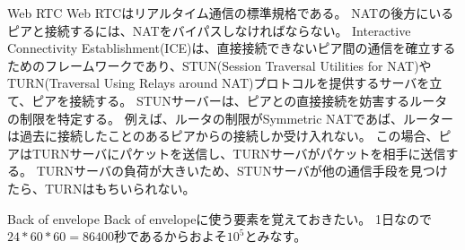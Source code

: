 \documentclass{jlreq}
\begin{document}
\begin{section-bib}{Web RTC}
  Web RTCはリアルタイム通信の標準規格である\cite{webrtc}。
  NATの後方にいるピアと接続するには、NATをバイパスしなければならない。
  Interactive Connectivity Establishment(ICE)は、直接接続できないピア間の通信を確立するためのフレームワークであり、STUN(Session Traversal Utilities for NAT)やTURN(Traversal Using Relays around NAT)プロトコルを提供するサーバを立て、ピアを接続する\cite{mdn-webrtc}。
  STUNサーバーは、ピアとの直接接続を妨害するルータの制限を特定する。
  例えば、ルータの制限がSymmetric NATであば、ルーターは過去に接続したことのあるピアからの接続しか受け入れない。
  この場合、ピアはTURNサーバにパケットを送信し、TURNサーバがパケットを相手に送信する。
  TURNサーバの負荷が大きいため、STUNサーバが他の通信手段を見つけたら、TURNはもちいられない。
\end{section-bib}
\begin{section-bib}{Back of envelope}
  Back of envelopeに使う要素を覚えておきたい。
  1日なので$24*60*60=86400$秒であるからおよそ$10^5$とみなす。
\end{section-bib}
\end{document}
